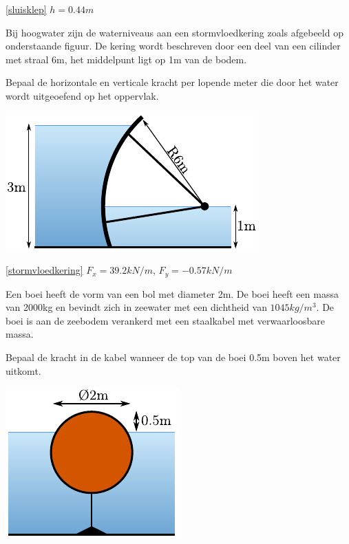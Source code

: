 \begin{antwoord}{\ref{sluisklep}}
	$h = 0.44\unit{m}$
\end{antwoord}
\begin{toepassing}[*]
	\label{stormvloedkering}
Bij hoogwater zijn de waterniveaus aan een stormvloedkering zoals afgebeeld op onderstaande figuur. De kering wordt beschreven door een deel van een cilinder met straal 6m, het middelpunt ligt op 1m van de bodem.
		
Bepaal de horizontale en verticale kracht per lopende meter die door het water wordt uitgeoefend op het oppervlak.

	\centering
	\includegraphics{fig/hydrostatica/stormvloedkering}
\end{toepassing}
\begin{antwoord}{\ref{stormvloedkering}}
	$F_x = 39.2\unit{kN/m}$, $F_y = -0.57\unit{kN/m}$
\end{antwoord}
\begin{toepassing}
	\label{boei}
Een boei heeft de vorm van een bol met diameter 2m. De boei heeft een massa van 2000kg en bevindt zich in zeewater met een dichtheid van $1045\unit{kg/m^3}$. De boei is aan de zeebodem verankerd met een staalkabel met verwaarloosbare massa.
		
Bepaal de kracht in de kabel wanneer de top van de boei 0.5m boven het water uitkomt.

	\centering
	\includegraphics{fig/hydrostatica/boei}
\end{toepassing}
